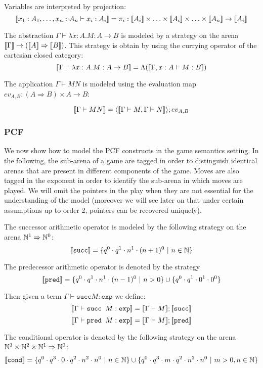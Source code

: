 Variables are interpreted by projection:
$$\sem{x_1 : A_1, \ldots, x_n:A_n \vdash x_i : A_i} = \pi_i : \sem{A_i} \times \ldots \times \sem{A_i} \times \ldots \times \sem{A_n} \rightarrow  \sem{A_i}$$

The abstraction $\Gamma \vdash \lambda x :A.M : A \rightarrow B$ is modeled by a strategy on the arena
${[\![ \Gamma ]\!]} \rightarrow ({[\![ A ]\!]}\Rightarrow{[\![B ]\!]})$. This strategy is obtain by using the currying operator of the
cartesian closed category:
$${[\![ \Gamma \vdash \lambda x :A.M : A \rightarrow B ]\!]} = \Lambda( {[\![ \Gamma, x :A \vdash M : B ]\!]})$$

The application $\Gamma \vdash M N$ is modeled using the evaluation map $ev_{A,B} : (A\Rightarrow B)\times A \rightarrow B$:

$${[\![ \Gamma \vdash M N ]\!]} = \langle {[\![\Gamma \vdash M, \Gamma \vdash N ]\!]} \rangle; ev_{A,B}$$


\subsubsection{PCF}

We now show how to model the PCF constructs in the game semantics setting.
In the following, the sub-arena of a game are tagged in order to distinguish identical arenas that are present in different components of the game.
Moves are also tagged in the exponent in order to identify the sub-arena in which moves are played. We will omit the pointers in the play
when they are not essential for the understanding of the model (moreover we will see later on that under certain assumptions
up to order 2, pointers can be recovered uniquely).

The successor arithmetic operator is modeled by the following strategy on the arena $\mathbb{N}^1 \Rightarrow \mathbb{N}^0$:
$${[\![ \texttt{succ} ]\!]} = \{q^0 \cdot q^1 \cdot n^1 \cdot (n+1)^0\ |\ n \in \mathbb{N} \}$$

The predecessor arithmetic operator is denoted by the strategy
$${[\![ \texttt{pred} ]\!]} = \{q^0 \cdot q^1 \cdot n^1 \cdot (n-1)^0\ |\ n >0 \} \cup \{ q^0 \cdot q^1 \cdot 0^1 \cdot 0^0 \} $$

Then given a term $\Gamma \vdash \texttt{succ} M : \texttt{exp}$ we define:
$${[\![ \Gamma \vdash \texttt{succ } M : \texttt{exp} ]\!]} = {[\![ \Gamma \vdash M ]\!]} ; {[\![ \texttt{succ} ]\!]} $$
$${[\![ \Gamma \vdash \texttt{pred } M : \texttt{exp} ]\!]} = {[\![ \Gamma \vdash M ]\!]} ; {[\![ \texttt{pred} ]\!]} $$


The conditional operator is denoted by the following strategy on the arena $\mathbb{N}^3 \times \mathbb{N}^2 \times \mathbb{N} ^1 \Rightarrow \mathbb{N}^0$:
$${[\![ \texttt{cond} ]\!]} =
    \{ q^0 \cdot q^3 \cdot 0 \cdot q^2 \cdot n^2 \cdot n^0 \ | \ n \in \mathbb{N} \}
    \cup
    \{ q^0 \cdot q^3 \cdot m \cdot q^2 \cdot n^2 \cdot n^0 \ | \ m >0, n \in \mathbb{N} \}
    $$


